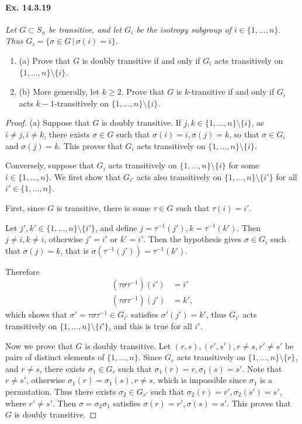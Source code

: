 \documentclass[11pt,a4paper]{article}
\newcommand{\be} {\begin{enumerate}}
\newcommand{\ee} {\end{enumerate}}
\begin{document}
 \paragraph{Ex. 14.3.19}{\it Let $G \subset S_n$ be transitive, and let $G_i$ be the isotropy subgroup of $i\in \{1,\ldots,n\}$. Thus $G_i = \{\sigma \in G \, | \, \sigma(i) = i\}$.
 \be
 \item[(a)] Prove that $G$ is doubly transitive if and only if $G_i$ acts transitively on $\{1,\ldots,n\} \setminus \{i\}$.
 \item[(b)] More generally, let $k\geq 2$. Prove that $G$ is $k$-transitive if and only if $G_i$ acts $k-1$-transitively on $\{1,\ldots,n\} \setminus \{i\}$.
 \ee
 }
 \begin{proof}
 \item[(a)] Suppose that $G$ is doubly transitive. If  $j,k\in \{1,\ldots,n\} \setminus \{i\}$, as $i \ne j, i\ne k$, there exists $\sigma \in G$ such that $\sigma(i) = i, \sigma(j) = k$, so that $\sigma \in G_i$  and $\sigma(j) = k$. This proves that $G_i$ acts transitively on $\{1,\ldots,n\} \setminus \{i\}$.
 
 Conversely, suppose that $G_i$ acts transitively on $\{1,\ldots,n\} \setminus \{i\}$ for some $i \in \{1,\ldots,n\}$.
We first show that $G_{i'}$ acts also transitively on $\{1,\ldots,n\} \setminus \{i'\}$ for all $i' \in \{1,\ldots,n\}$. 

First, since $G$ is transitive, there is some $\tau \in G$ such that $\tau(i) = i'$.

Let $j' , k' \in \{1,\ldots,n\} \setminus \{i'\}$, and define $j = \tau^{-1}(j'), k = \tau^{-1}(k')$. Then $j \ne i, k \ne i$, otherwise $j'= i'$ or $k' =i'$.
Then the hypothesis gives $\sigma \in G_i$ such that $\sigma(j) =k$, that is $\sigma(\tau^{-1}(j')) =\tau^{-1}(k')$.

Therefore
\begin{align*}
(\tau \sigma \tau^{-1})(i') &= i'\\
(\tau \sigma \tau^{-1})(j') &= k',
\end{align*}
 which shows that $\sigma'  = \tau \sigma \tau^{-1}\in G_{i'}$ satisfies $\sigma'(j') = k'$, thus $G_{i'}$ acts transitively on $\{1,\ldots,n\} \setminus \{i'\}$, and this is true for all $i'$.

Now we prove that $G$ is doubly transitive. Let $(r,s),(r',s'),r\ne s, r'\ne s'$ be pairs of distinct elements of $\{1,\ldots,n\}$. 	
Since $G_{r}$ acts transitively on $\{1,\ldots,n\} \setminus \{r\}$, and $r\ne s$, there exists $\sigma_1 \in G_r$ such that $\sigma_1(r) = r, \sigma_1(s) = s'$. Note that $r \ne s'$, otherwise $\sigma_1(r) = \sigma_1(s) ,r\ne s$, which is impossible since $\sigma_1$ is a permutation. Thus there exists $\sigma_2 \in G_{s'}$ such that $\sigma_2(r) = r', \sigma_2(s') = s'$, where $r'\ne s'$. Then $\sigma = \sigma_2\sigma_1$ satisfies $\sigma(r) = r', \sigma(s) = s'$. This proves that $G$ is doubly transitive.


\end{proof}
\end{document}
